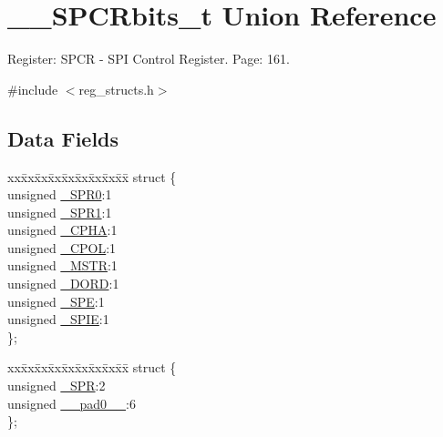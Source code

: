 \hypertarget{union_____s_p_c_rbits__t}{\section{\+\_\+\+\_\+\+S\+P\+C\+Rbits\+\_\+t Union Reference}
\label{union_____s_p_c_rbits__t}
}


Register\+: S\+P\+C\+R -\/ S\+P\+I Control Register. Page\+: 161.  




{\ttfamily \#include $<$reg\+\_\+structs.\+h$>$}

\subsection*{Data Fields}
\begin{DoxyCompactItemize}
\item 
\begin{tabbing}
xx\=xx\=xx\=xx\=xx\=xx\=xx\=xx\=xx\=\kill
struct \{\\
\>unsigned \hyperlink{union_____s_p_c_rbits__t_a4bbf8c9e5c1acd96c09c2b6223245e8c}{\_SPR0}:1\\
\>unsigned \hyperlink{union_____s_p_c_rbits__t_a6d4c0532d6c61dfe6a9fc6e86366c716}{\_SPR1}:1\\
\>unsigned \hyperlink{union_____s_p_c_rbits__t_aa2e70d38a84581304a7ca4e690880c37}{\_CPHA}:1\\
\>unsigned \hyperlink{union_____s_p_c_rbits__t_a097403e851bd5b6a5581e9dbe8110b21}{\_CPOL}:1\\
\>unsigned \hyperlink{union_____s_p_c_rbits__t_ac148c1e4e900c038692e8fab533ee879}{\_MSTR}:1\\
\>unsigned \hyperlink{union_____s_p_c_rbits__t_ab537205dda51481136acdc12b6b249f6}{\_DORD}:1\\
\>unsigned \hyperlink{union_____s_p_c_rbits__t_a4c11fd26c5a7d1f83c77acee3ca48c7e}{\_SPE}:1\\
\>unsigned \hyperlink{union_____s_p_c_rbits__t_a5d00a7ae12a6e8fc3bbef1a0776ff919}{\_SPIE}:1\\
\}; \\

\end{tabbing}\item 
\begin{tabbing}
xx\=xx\=xx\=xx\=xx\=xx\=xx\=xx\=xx\=\kill
struct \{\\
\>unsigned \hyperlink{union_____s_p_c_rbits__t_ac33e231100cc426e979611202456f2ef}{\_SPR}:2\\
\>unsigned \hyperlink{union_____s_p_c_rbits__t_a62daba40d4dad07c9e189858267c4577}{\_\_pad0\_\_}:6\\
\}; \\


\end{tabbing}
\end{DoxyCompactItemize}
